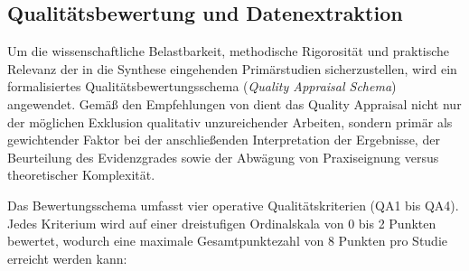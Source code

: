 \subsection{Qualitätsbewertung und Datenextraktion}
\label{subsec:qualitaetsbewertung_datenextraktion}

Um die wissenschaftliche Belastbarkeit, methodische Rigorosität und praktische Relevanz der in die Synthese eingehenden Primärstudien sicherzustellen, wird ein formalisiertes Qualitätsbewertungsschema (\textit{Quality Appraisal Schema}) angewendet. Gemäß den Empfehlungen von \cite{2NHFUF5N} dient das Quality Appraisal nicht nur der möglichen Exklusion qualitativ unzureichender Arbeiten, sondern primär als gewichtender Faktor bei der anschließenden Interpretation der Ergebnisse, der Beurteilung des Evidenzgrades sowie der Abwägung von Praxiseignung versus theoretischer Komplexität.

Das Bewertungsschema umfasst vier operative Qualitätskriterien (QA1 bis QA4). Jedes Kriterium wird auf einer dreistufigen Ordinalskala von 0 bis 2 Punkten bewertet, wodurch eine maximale Gesamtpunktezahl von 8 Punkten pro Studie erreicht werden kann:

